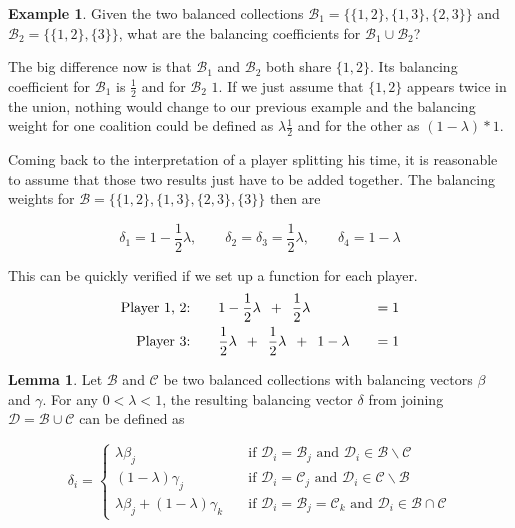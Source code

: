 \documentclass[10pt,a4paper,titlepage]{article}
\theoremstyle{plain}
\theoremstyle{definition}
\newtheorem{example}[thm]{Example} %
\newtheorem{lemma}[thm]{Lemma}
\begin{document}
\begin{example}\label{ex:twounion}
    Given the two balanced collections $\mathcal{B}_1 = \{\{1, 2\}, \{1, 3\}, \{2, 3\}\}$ and $\mathcal{B}_2 = \{\{1, 2\}, \{3\}\}$, what are the balancing coefficients for $\mathcal{B}_1 \cup \mathcal{B}_2$?

    The big difference now is that $\mathcal{B}_1$ and $\mathcal{B}_2$ both share $\{1, 2\}$. Its balancing coefficient for $\mathcal{B}_1$ is $\frac{1}{2}$ and for $\mathcal{B}_2$ $1$. If we just assume that $\{1, 2\}$ appears twice in the union, nothing would change to our previous example and the balancing weight for one coalition could be defined as $\lambda \frac{1}{2}$ and for the other as $(1 - \lambda) * 1$.

    Coming back to the interpretation of a player splitting his time, it is reasonable to assume that those two results just have to be added together. The balancing weights for $\mathcal{B} = \{\{1, 2\}, \{1, 3\}, \{2, 3\}, \{3\}\}$ then are

    \begin{equation*}
        \delta_1 = 1 - \frac{1}{2}\lambda,\qquad \delta_2 = \delta_3 = \frac{1}{2}\lambda,\qquad \delta_4 = 1 - \lambda
    \end{equation*}

    This can be quickly verified if we set up a function for each player.
    \begin{alignat*}{2}
        \text{Player 1, 2:}\qquad &1 - \frac{1}{2}\lambda\enskip +\enskip \frac{1}{2}\lambda &\quad= 1\\
        \text{Player 3:}\qquad &\frac{1}{2}\lambda\enskip  + \enskip \frac{1}{2}\lambda \enskip + \enskip 1 - \lambda &\quad= 1
    \end{alignat*}
\end{example}

\begin{lemma}\label{lem:balancedunion}
    Let $\mathcal{B}$ and $\mathcal{C}$ be two balanced collections with balancing vectors $\beta$ and $\gamma$. For any $0 < \lambda < 1$, the resulting balancing vector $\delta$ from joining $\mathcal{D} = \mathcal{B} \cup \mathcal{C}$ can be defined as

    \begin{equation}
        \delta_i = \begin{cases}
            \lambda \beta_j & \quad \text{if } \mathcal{D}_i = \mathcal{B}_j \text{ and } \mathcal{D}_i \in \mathcal{B} \backslash \mathcal{C}\\
            (1 - \lambda) \gamma_j & \quad \text{if } \mathcal{D}_i = \mathcal{C}_j \text{ and } \mathcal{D}_i \in \mathcal{C} \backslash \mathcal{B}\\
            \lambda \beta_j + (1 - \lambda) \gamma_k & \quad \text{if } \mathcal{D}_i = \mathcal{B}_j = \mathcal{C}_k \text{ and } \mathcal{D}_i \in \mathcal{B} \cap \mathcal{C}
        \end{cases}
    \end{equation}
\end{lemma}
\end{document}
